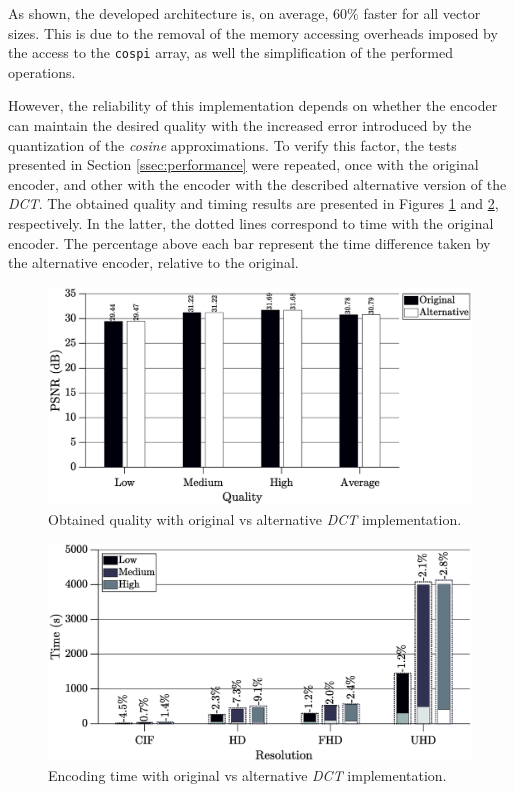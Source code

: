 As shown, the developed architecture is, on average, $60\%$ faster for all vector sizes. This is due to the removal of the memory accessing overheads imposed by the access to the \texttt{cospi} array, as well the simplification of the performed operations. 

However, the reliability of this implementation depends on whether the encoder can maintain the desired quality with the increased error introduced by the quantization of the \emph{cosine} approximations. To verify this factor, the tests presented in Section \ref{ssec:performance} were repeated, once with the original encoder, and other with the encoder with the described alternative version of the \emph{DCT}. The obtained quality and timing results are presented in Figures \ref{fig:buttqual} and \ref{fig:butttime}, respectively. In the latter, the dotted lines correspond to time with the original encoder. The percentage above each bar represent the time difference taken by the alternative encoder, relative to the original.

\begin{figure}[!htb]
    \centering
    \includegraphics[width=\textwidth]{Sections/4DevelopedArchitecture/Figures/buttmultqual.eps}
    \caption{Obtained quality with original vs alternative \emph{DCT} implementation.}
    \label{fig:buttqual}
\end{figure}

\begin{figure}[!htb]
    \centering
    \includegraphics[width=\textwidth]{Sections/4DevelopedArchitecture/Figures/buttmulttime.eps}
    \caption{Encoding time with original vs alternative \emph{DCT} implementation.}
    \label{fig:butttime}
\end{figure}

